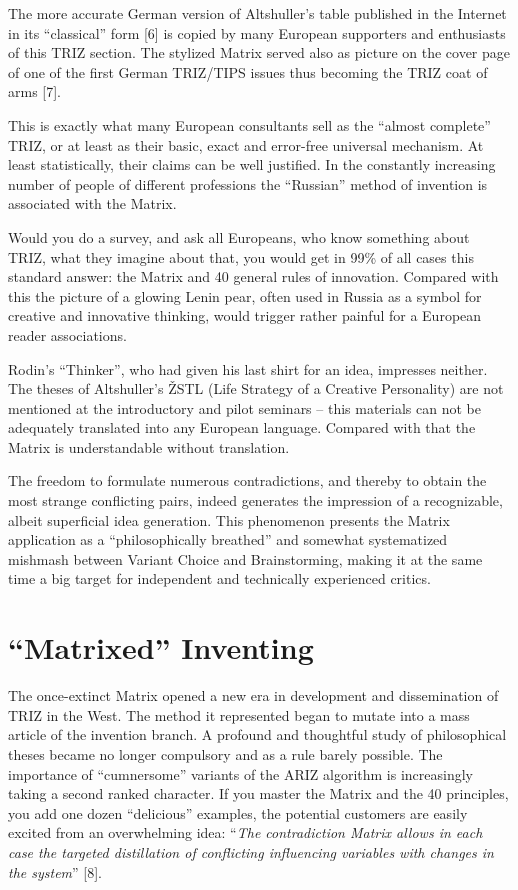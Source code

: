 \documentclass[11pt,a4paper]{article}
\begin{document}
The more accurate German version of Altshuller's table published in the
Internet in its ``classical'' form [6] is copied by many European supporters
and enthusiasts of this TRIZ section. The stylized Matrix served also as
picture on the cover page of one of the first German TRIZ/TIPS issues thus
becoming the TRIZ coat of arms [7].

This is exactly what many European consultants sell as the ``almost complete''
TRIZ, or at least as their basic, exact and error-free universal mechanism. At
least statistically, their claims can be well justified. In the constantly
increasing number of people of different professions the ``Russian'' method of
invention is associated with the Matrix.

Would you do a survey, and ask all Europeans, who know something about TRIZ,
what they imagine about that, you would get in 99\% of all cases this standard
answer: the Matrix and 40 general rules of innovation. Compared with this the
picture of a glowing Lenin pear, often used in Russia as a symbol for creative
and innovative thinking, would trigger rather painful for a European reader
associations.

Rodin's ``Thinker'', who had given his last shirt for an idea, impresses
neither.  The theses of Altshuller's \v{Z}STL (Life Strategy of a Creative
Personality) are not mentioned at the introductory and pilot seminars -- this
materials can not be adequately translated into any European language.
Compared with that the Matrix is understandable without translation.

The freedom to formulate numerous contradictions, and thereby to obtain the
most strange conflicting pairs, indeed generates the impression of a
recognizable, albeit superficial idea generation. This phenomenon presents the
Matrix application as a ``philosophically breathed'' and somewhat systematized
mishmash between Variant Choice and Brainstorming, making it at the same time
a big target for independent and technically experienced critics.

\section*{``Matrixed'' Inventing}
The once-extinct Matrix opened a new era in development and dissemination of
TRIZ in the West. The method it represented began to mutate into a mass
article of the invention branch. A profound and thoughtful study of
philosophical theses became no longer compulsory and as a rule barely
possible. The importance of ``cumnersome'' variants of the ARIZ algorithm is
increasingly taking a second ranked character. If you master the Matrix and
the 40 principles, you add one dozen ``delicious'' examples, the potential
customers are easily excited from an overwhelming idea: ``\emph{The
  contradiction Matrix allows in each case the targeted distillation of
  conflicting influencing variables with changes in the system}'' [8].
\end{document}
